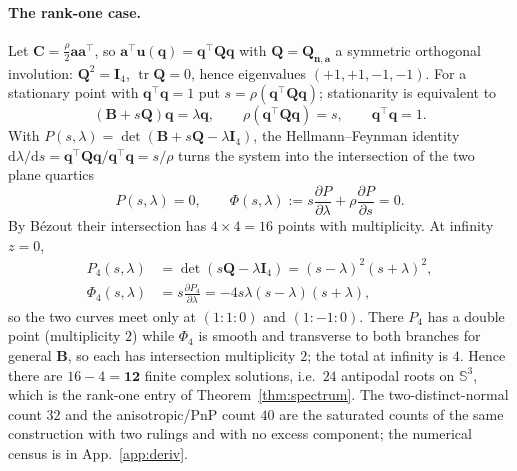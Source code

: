 \paragraph{The rank-one case.} Let $\mathbf C=\tfrac{\rho}{2}\mathbf a\mathbf a^\top$, so $\mathbf a^\top\mathbf u(\mathbf q)=\mathbf q^\top\mathbf Q\mathbf q$ with $\mathbf Q=\mathbf Q_{\mathbf n,\mathbf a}$ a symmetric orthogonal involution: $\mathbf Q^2=\mathbf I_4$, $\operatorname{tr}\mathbf Q=0$, hence eigenvalues $(+1,+1,-1,-1)$. For a stationary point with $\mathbf q^\top\mathbf q=1$ put $s=\rho(\mathbf q^\top\mathbf Q\mathbf q)$; stationarity is equivalent to
\begin{equation}
(\mathbf B+s\mathbf Q)\mathbf q=\lambda\mathbf q,\qquad \rho(\mathbf q^\top\mathbf Q\mathbf q)=s,\qquad \mathbf q^\top\mathbf q=1 .
\end{equation}
With $P(s,\lambda)=\det(\mathbf B+s\mathbf Q-\lambda\mathbf I_4)$, the Hellmann--Feynman identity $\mathrm d\lambda/\mathrm ds=\mathbf q^\top\mathbf Q\mathbf q/\mathbf q^\top\mathbf q=s/\rho$ turns the system into the intersection of the two plane quartics
\begin{equation}
P(s,\lambda)=0,\qquad \Phi(s,\lambda):=s\frac{\partial P}{\partial\lambda}+\rho\frac{\partial P}{\partial s}=0 .
\end{equation}
By Bézout their intersection has $4\times4=16$ points with multiplicity. At infinity $z=0$,
\begin{equation}
\begin{aligned}
P_4(s,\lambda)&=\det(s\mathbf Q-\lambda\mathbf I_4)=(s-\lambda)^2(s+\lambda)^2,\\
\Phi_4(s,\lambda)&=s\frac{\partial P_4}{\partial\lambda}=-4s\lambda(s-\lambda)(s+\lambda),
\end{aligned}
\end{equation}
so the two curves meet only at $(1:1:0)$ and $(1:-1:0)$. There $P_4$ has a double point (multiplicity $2$) while $\Phi_4$ is smooth and transverse to both branches for general $\mathbf B$, so each has intersection multiplicity $2$; the total at infinity is $4$. Hence there are $16-4=\mathbf{12}$ finite complex solutions, i.e.\ $24$ antipodal roots on $\mathbb S^3$, which is the rank-one entry of Theorem~\ref{thm:spectrum}. The two-distinct-normal count $32$ and the anisotropic/PnP count $40$ are the saturated counts of the same construction with two rulings and with no excess component; the numerical census is in App.~\ref{app:deriv}.

